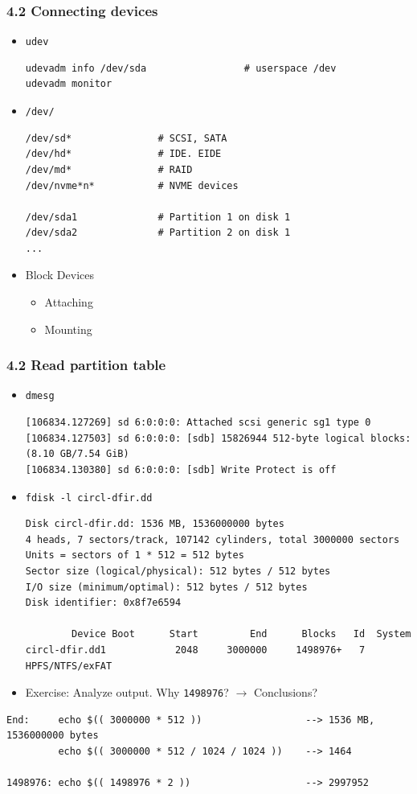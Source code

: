 \begin{frame}[fragile]
  \frametitle{4.2 Connecting devices}
    \begin{itemize}
        \item \texttt{udev} 
\begin{lstlisting}[basicstyle=\tiny]
udevadm info /dev/sda                 # userspace /dev
udevadm monitor
\end{lstlisting}
        \item \texttt{/dev/}
\begin{lstlisting}[basicstyle=\tiny]
/dev/sd*               # SCSI, SATA
/dev/hd*               # IDE. EIDE
/dev/md*               # RAID
/dev/nvme*n*           # NVME devices

/dev/sda1              # Partition 1 on disk 1
/dev/sda2              # Partition 2 on disk 1
...
\end{lstlisting}
        \item Block Devices
        \begin{itemize}
            \item Attaching
            \item Mounting
        \end{itemize}
    \end{itemize}
\end{frame}


\begin{frame}[fragile]
  \frametitle{4.2 Read partition table}
    \begin{itemize}
        \item \texttt{dmesg} 
\begin{lstlisting}[basicstyle=\tiny]
[106834.127269] sd 6:0:0:0: Attached scsi generic sg1 type 0
[106834.127503] sd 6:0:0:0: [sdb] 15826944 512-byte logical blocks: (8.10 GB/7.54 GiB)
[106834.130380] sd 6:0:0:0: [sdb] Write Protect is off
\end{lstlisting}
        \item \texttt{fdisk -l circl-dfir.dd}
\begin{lstlisting}[basicstyle=\tiny]
Disk circl-dfir.dd: 1536 MB, 1536000000 bytes
4 heads, 7 sectors/track, 107142 cylinders, total 3000000 sectors
Units = sectors of 1 * 512 = 512 bytes
Sector size (logical/physical): 512 bytes / 512 bytes
I/O size (minimum/optimal): 512 bytes / 512 bytes
Disk identifier: 0x8f7e6594

        Device Boot      Start         End      Blocks   Id  System
circl-dfir.dd1            2048     3000000     1498976+   7  HPFS/NTFS/exFAT
\end{lstlisting}
        \item Exercise: Analyze output. Why \texttt{1498976}? $\to$ Conclusions?
    \end{itemize}
\begin{lstlisting}[basicstyle=\tiny]
End:     echo $(( 3000000 * 512 ))                  --> 1536 MB, 1536000000 bytes 
         echo $(( 3000000 * 512 / 1024 / 1024 ))    --> 1464

1498976: echo $(( 1498976 * 2 ))                    --> 2997952
\end{lstlisting}
\end{frame}


